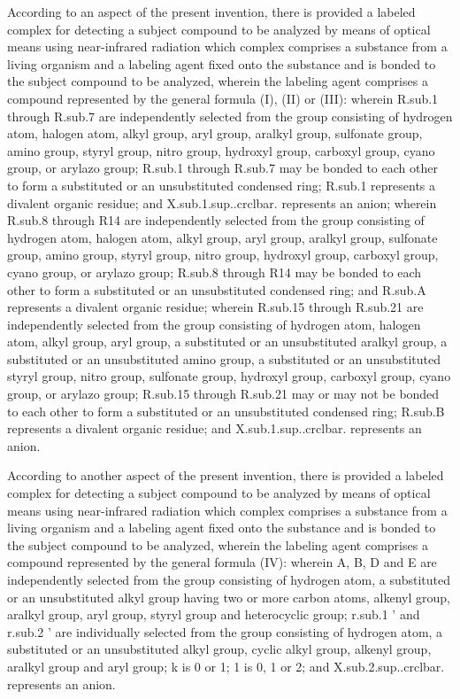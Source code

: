 \documentclass[11pt,a4paper]{article}
\begin{document}
According to an aspect of the present invention, there is provided a labeled complex for detecting a subject compound to be analyzed by means of optical means using near-infrared radiation which complex comprises a substance from a living organism and a labeling agent fixed onto the substance and is bonded to the subject compound to be analyzed, wherein the labeling agent comprises a compound represented by the general formula (I), (II) or (III): wherein R.sub.1 through R.sub.7 are independently selected from the group consisting of hydrogen atom, halogen atom, alkyl group, aryl group, aralkyl group, sulfonate group, amino group, styryl group, nitro group, hydroxyl group, carboxyl group, cyano group, or arylazo group; R.sub.1 through R.sub.7 may be bonded to each other to form a substituted or an unsubstituted condensed ring; R.sub.1 represents a divalent organic residue; and X.sub.1.sup..crclbar. represents an anion; wherein R.sub.8 through R14 are independently selected from the group consisting of hydrogen atom, halogen atom, alkyl group, aryl group, aralkyl group, sulfonate group, amino group, styryl group, nitro group, hydroxyl group, carboxyl group, cyano group, or arylazo group; R.sub.8 through R14 may be bonded to each other to form a substituted or an unsubstituted condensed ring; and R.sub.A represents a divalent organic residue; wherein R.sub.15 through R.sub.21 are independently selected from the group consisting of hydrogen atom, halogen atom, alkyl group, aryl group, a substituted or an unsubstituted aralkyl group, a substituted or an unsubstituted amino group, a substituted or an unsubstituted styryl group, nitro group, sulfonate group, hydroxyl group, carboxyl group, cyano group, or arylazo group; R.sub.15 through R.sub.21 may or may not be bonded to each other to form a substituted or an unsubstituted condensed ring; R.sub.B represents a divalent organic residue; and X.sub.1.sup..crclbar. represents an anion.

According to another aspect of the present invention, there is provided a labeled complex for detecting a subject compound to be analyzed by means of optical means using near-infrared radiation which complex comprises a substance from a living organism and a labeling agent fixed onto the substance and is bonded to the subject compound to be analyzed, wherein the labeling agent comprises a compound represented by the general formula (IV): wherein A, B, D and E are independently selected from the group consisting of hydrogen atom, a substituted or an unsubstituted alkyl group having two or more carbon atoms, alkenyl group, aralkyl group, aryl group, styryl group and heterocyclic group; r.sub.1 ' and r.sub.2 ' are individually selected from the group consisting of hydrogen atom, a substituted or an unsubstituted alkyl group, cyclic alkyl group, alkenyl group, aralkyl group and aryl group; k is 0 or 1; 1 is 0, 1 or 2; and X.sub.2.sup..crclbar.  represents an anion.
\end{document}
